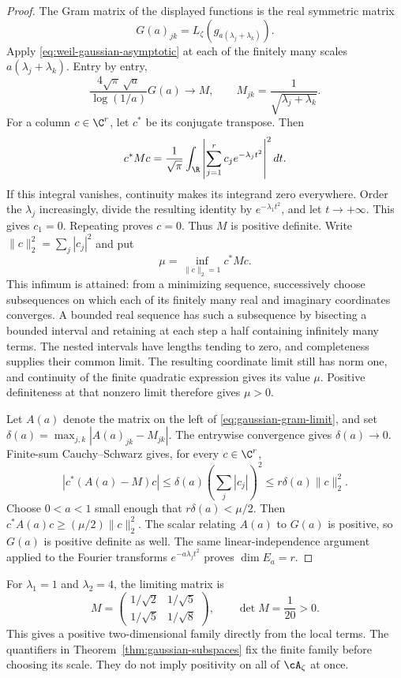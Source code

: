\begin{proof}
The Gram matrix of the displayed functions is the real symmetric matrix
\[
 G(a)_{jk}=L_\zeta(g_{a(\lambda_j+\lambda_k)}).
\]
Apply \eqref{eq:weil-gaussian-asymptotic} at each of the finitely many
scales $a(\lambda_j+\lambda_k)$.  Entry by entry,
\begin{equation}
 \frac{4\sqrt\pi\,\sqrt a}{\log(1/a)}G(a)
 \longrightarrow M,
 \qquad M_{jk}=\frac1{\sqrt{\lambda_j+\lambda_k}}.
 \label{eq:gaussian-gram-limit}
\end{equation}
For a column $c\in\C^r$, let $c^*$ be its conjugate transpose.  Then
\begin{equation}
 c^*Mc=\frac1{\sqrt\pi}\int_{\R}
       \left|\sum_{j=1}^r c_j e^{-\lambda_j t^2}\right|^2dt.
 \label{eq:limiting-gaussian-gram}
\end{equation}
If this integral vanishes, continuity makes its integrand zero everywhere.
Order the $\lambda_j$ increasingly, divide the resulting identity by
$e^{-\lambda_1t^2}$, and let $t\to+\infty$.
This gives $c_1=0$.  Repeating proves $c=0$.
Thus $M$ is positive definite.
Write $\|c\|_2^2=\sum_j|c_j|^2$ and put
\[
 \mu=\inf_{\|c\|_2=1}c^*Mc.
\]
This infimum is attained: from a minimizing sequence, successively
choose subsequences on which each of its finitely many real and imaginary
coordinates converges.  A bounded real sequence has such a subsequence
by bisecting a bounded interval and retaining at each step a half
containing infinitely many terms.  The nested intervals have lengths
tending to zero, and completeness supplies their common limit.
The resulting coordinate limit still has norm one, and continuity of
the finite quadratic expression gives its value $\mu$.
Positive definiteness at that nonzero limit therefore gives $\mu>0$.

Let $A(a)$ denote the matrix on the left of
\eqref{eq:gaussian-gram-limit}, and set
$\delta(a)=\max_{j,k}|A(a)_{jk}-M_{jk}|$.
The entrywise convergence gives $\delta(a)\to0$.
Finite-sum Cauchy--Schwarz gives, for every $c\in\C^r$,
\[
 |c^*(A(a)-M)c|
 \leq\delta(a)\left(\sum_j|c_j|\right)^2
 \leq r\delta(a)\|c\|_2^2.
\]
Choose $0<a<1$ small enough that $r\delta(a)<\mu/2$.
Then $c^*A(a)c\geq(\mu/2)\|c\|_2^2$.
The scalar relating $A(a)$ to $G(a)$ is positive, so $G(a)$ is positive
definite as well.
The same linear-independence argument applied to the Fourier transforms
$e^{-a\lambda_jt^2}$ proves $\dim E_a=r$.
\end{proof}

For $\lambda_1=1$ and $\lambda_2=4$, the limiting matrix is
\[
 M=\begin{pmatrix}1/\sqrt2&1/\sqrt5\\1/\sqrt5&1/\sqrt8\end{pmatrix},
 \qquad\det M=\frac1{20}>0.
\]
This gives a positive two-dimensional family directly from the local terms.
The quantifiers in Theorem~\ref{thm:gaussian-subspaces} fix the finite family
before choosing its scale.  They do not imply positivity on all of
$\cA_\zeta$ at once.

